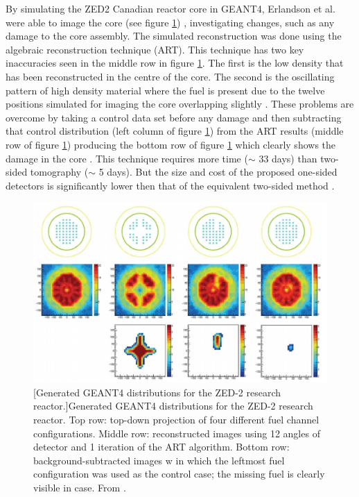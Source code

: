 By simulating the ZED2 Canadian reactor core in GEANT4, Erlandson et al. were able to image the core (see figure \ref{fig:Zed2OstSimulation}) \cite{Erlandson_reactorOST_2018}, investigating changes, such as any damage to the core assembly. The simulated reconstruction was done using the algebraic reconstruction technique (ART). This technique has two key inaccuracies seen in the middle row in figure \ref{fig:Zed2OstSimulation}. The first is the low density that has been reconstructed in the centre of the core. The second is the oscillating pattern of high density material where the fuel is present due to the twelve positions simulated for imaging the core overlapping slightly \cite{Erlandson_reactorOST_2018} . These problems are overcome by taking a control data set before any damage and then subtracting that control distribution (left column of figure \ref{fig:Zed2OstSimulation}) from the ART results (middle row of figure \ref{fig:Zed2OstSimulation}) producing the bottom row of figure \ref{fig:Zed2OstSimulation} which clearly shows the damage in the core \cite{Erlandson_reactorOST_2018}. This technique requires more time ($\sim$ 33 days) than two-sided tomography ($\sim$ 5 days). But the size and cost of the proposed one-sided detectors is significantly lower then that of the equivalent two-sided method \cite{Erlandson_reactorOST_2018}. 

\begin{figure}[!h]
 \centering
 \includegraphics[width=1.0\linewidth]{Chapter5/Figs/MuTomographyExamples/Zed2OstSimulation.jpg}
 [Generated GEANT4 distributions for the ZED-2 research reactor.]{Generated GEANT4 distributions for the ZED-2 research reactor. Top row: top-down projection of four different fuel channel configurations. Middle row: reconstructed images using 12 angles of detector and 1 iteration of the ART algorithm. Bottom row: background-subtracted images w in which the leftmost fuel configuration was used as the control case; the missing fuel is clearly visible in case. From \cite{Erlandson_reactorOST_2018}.} 
 \label{fig:Zed2OstSimulation}
\end{figure}

